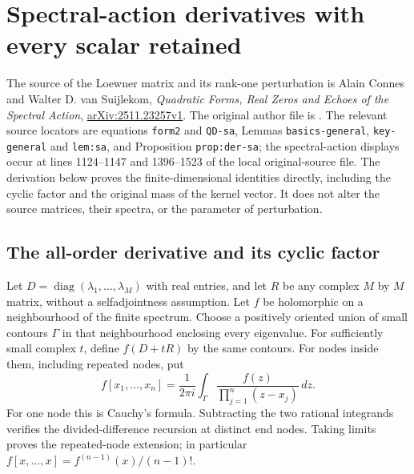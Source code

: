 \section{Spectral-action derivatives with every scalar retained}
\label{sec:spectral-action-retained-constants}

The source of the Loewner matrix and its rank-one perturbation is
Alain Connes and Walter D. van Suijlekom,
\emph{Quadratic Forms, Real Zeros and Echoes of the Spectral Action},
\href{https://arxiv.org/abs/2511.23257v1}{arXiv:2511.23257v1}.
The original author file is .
The relevant source locators are equations \texttt{form2} and
\texttt{QD-sa}, Lemmas \texttt{basics-general}, \texttt{key-general}
and \texttt{lem:sa}, and Proposition \texttt{prop:der-sa}; the
spectral-action displays occur at lines 1124--1147 and 1396--1523
of the local original-source file. The derivation below proves the
finite-dimensional identities directly, including the cyclic factor
and the original mass of the kernel vector. It does not alter the
source matrices, their spectra, or the parameter of perturbation.

\subsection{The all-order derivative and its cyclic factor}

Let $D=\operatorname{diag}(\lambda_1,\ldots,\lambda_M)$ with real
entries, and let $R$ be any complex $M$ by $M$ matrix, without a
selfadjointness assumption. Let $f$ be holomorphic on a neighbourhood
of the finite spectrum. Choose a positively oriented union of small
contours $\Gamma$ in that neighbourhood enclosing every eigenvalue.
For sufficiently small complex $t$, define $f(D+tR)$ by the same
contours. For nodes inside them, including repeated nodes, put
\begin{equation}\tag{SAC1}
 f[x_1,\ldots,x_n]
 =\frac{1}{2\pi i}\int_\Gamma
       \frac{f(z)}{\prod_{j=1}^n(z-x_j)}\,dz.
\end{equation}
For one node this is Cauchy's formula. Subtracting the two rational
integrands verifies the divided-difference recursion at distinct
end nodes. Taking limits proves the repeated-node extension; in
particular $f[x,\ldots,x]=f^{(n-1)}(x)/(n-1)!$.

